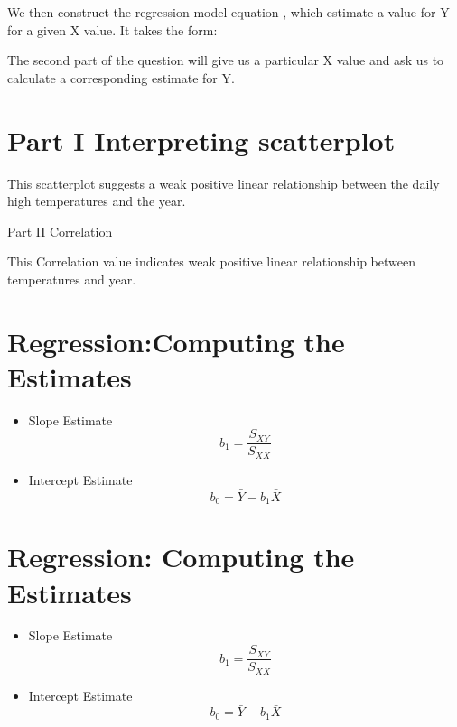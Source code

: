 \documentclass[]{report}
\begin{document}
We then construct the regression model equation , which estimate a value for Y for a  given X value. It takes the form:	

The second part of the question will give us a particular X value and ask us to calculate a corresponding estimate for Y.










\section{Part I Interpreting scatterplot}


This scatterplot suggests a weak positive linear relationship between the daily high temperatures and the year.


Part II 	Correlation


This Correlation value indicates weak positive linear relationship between temperatures and year.
\section{Regression:Computing the Estimates}
\begin{itemize}
	\item Slope Estimate
	\[b_1 = \frac{S_{XY}}{S_{XX}} \]
	\item Intercept Estimate
	\[b_0 = \bar{Y} - b_1\bar{X} \]
\end{itemize}

\section{Regression: Computing the Estimates}
\begin{itemize}
	\item Slope Estimate
	\[b_1 = \frac{S_{XY}}{S_{XX}} \]
	\item Intercept Estimate
	\[b_0 = \bar{Y} - b_1\bar{X} \]
\end{itemize}

\end{document}
